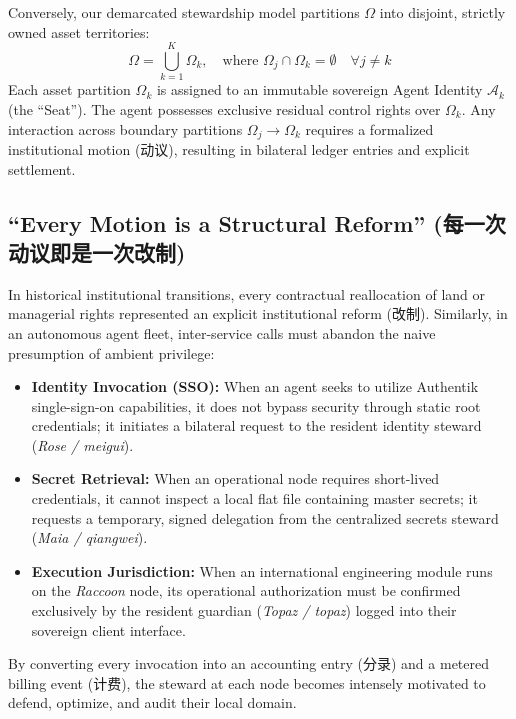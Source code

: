 \documentclass[11pt,a4paper]{article}
\begin{document}
Conversely, our demarcated stewardship model partitions $\Omega$ into disjoint, strictly owned asset territories:
\begin{equation}
\Omega = \bigcup_{k=1}^K \Omega_k, \quad \text{where } \Omega_j \cap \Omega_k = \emptyset \quad \forall j \neq k
\end{equation}
Each asset partition $\Omega_k$ is assigned to an immutable sovereign Agent Identity $\mathcal{A}_k$ (the ``Seat''). The agent possesses exclusive residual control rights over $\Omega_k$. Any interaction across boundary partitions $\Omega_j \to \Omega_k$ requires a formalized institutional motion (动议), resulting in bilateral ledger entries and explicit settlement.

\subsection{``Every Motion is a Structural Reform'' (每一次动议即是一次改制)}

In historical institutional transitions, every contractual reallocation of land or managerial rights represented an explicit institutional reform (改制). Similarly, in an autonomous agent fleet, inter-service calls must abandon the naive presumption of ambient privilege:
\begin{itemize}
    \item \textbf{Identity Invocation (SSO):} When an agent seeks to utilize Authentik single-sign-on capabilities, it does not bypass security through static root credentials; it initiates a bilateral request to the resident identity steward (\textit{Rose / meigui}).
    \item \textbf{Secret Retrieval:} When an operational node requires short-lived credentials, it cannot inspect a local flat file containing master secrets; it requests a temporary, signed delegation from the centralized secrets steward (\textit{Maia / qiangwei}).
    \item \textbf{Execution Jurisdiction:} When an international engineering module runs on the \textit{Raccoon} node, its operational authorization must be confirmed exclusively by the resident guardian (\textit{Topaz / topaz}) logged into their sovereign client interface.
\end{itemize}

By converting every invocation into an accounting entry (分录) and a metered billing event (计费), the steward at each node becomes intensely motivated to defend, optimize, and audit their local domain.
\end{document}
